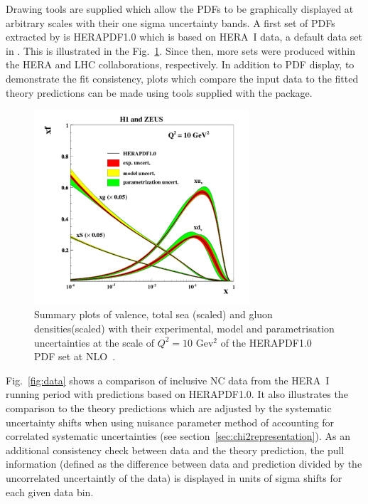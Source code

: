 \begin{description}
Drawing tools are supplied which allow the PDFs to be
graphically  displayed at arbitrary scales with their one sigma uncertainty bands. 
A first set of PDFs extracted by \fitter is HERAPDF1.0 \cite{h1zeus:2009wt} which is based on HERA~I data, a default data set in \fitter. 
This is illustrated in the Fig.~\ref{fig:hera1}. 
Since then, more sets were produced within the HERA and LHC collaborations, respectively.
In addition to PDF display, to demonstrate the fit consistency, plots 
which compare the input data to the fitted theory predictions can be made using
tools supplied with the package.
\begin{figure}[!ht]
   \centering
   \includegraphics[width=8cm]{hera1.pdf}
   \caption{Summary plots of valence, total sea (scaled) and gluon densities(scaled) with their experimental, model and parametrisation uncertainties at the scale of $Q^2=10$ Gev$^2$ of the HERAPDF1.0 PDF set at NLO~\cite{h1zeus:2009wt}.}
 \label{fig:hera1}
\end{figure}


Fig.~\ref{fig:data} shows a comparison of inclusive NC data from the HERA~I running period with predictions based on HERAPDF1.0. It also illustrates the comparison to the theory predictions which are adjusted by the  
systematic uncertainty shifts when using nuisance parameter method of accounting for 
correlated systematic uncertainties (see section~\ref{sec:chi2representation}). 
As an additional consistency check between data and the theory prediction, the pull information (defined as the difference between data and prediction divided by the uncorrelated uncertaintly of the data) is displayed in units of sigma shifts for each given data bin.


\end{description}
